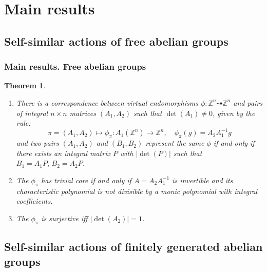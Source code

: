 \documentclass[notheorems,handout,san serif,hyperref={unicode}]{beamer} %
\newtheorem{theorem}{Theorem}[section]
\theoremstyle{definition}
\begin{document}
\section{Main results}

\subsection{Self-similar actions of free abelian groups}

\begin{frame}
	\frametitle{Main results. Free abelian groups}
	
	\begin{theorem}\quad
		
		\begin{enumerate}
			
			\item There is a correspondence between virtual endomorphisms $\phi : \mathbb{Z}^n \dashrightarrow \mathbb{Z}^n$ and pairs of integral $n\times n$ matrices $(A_1, A_2)$ such that $\det(A_1) \neq 0$, given by the rule:
			$$
			\pi = (A_1, A_2) \mapsto  \phi_{\pi}: A_1(\mathbb{Z}^n) \rightarrow \mathbb{Z}^n, \quad \phi_\pi (g) = A_2 A_1^{-1} g
			$$
			and two pairs $(A_1, A_2)$ and $(B_1, B_2)$ represent the same $\phi$ if and only if there exists an integral matrix $P$ with $|\det(P)|$ such that $B_1 = A_1 P, \, B_2 = A_2 P$.
			
			\item \label{criterion:free} The $\phi_\pi$ has trivial core if and only if $A = A_2A^{-1}_1$ is invertible and its characteristic polynomial is not divisible by a monic polynomial with integral coefficients. 
			
			
			\item The $\phi_\pi$ is surjective iff $|\det(A_2)| = 1$. 
			
		\end{enumerate}
	\end{theorem}
\end{frame}


\subsection{Self-similar actions of finitely generated abelian groups}
\end{document}
